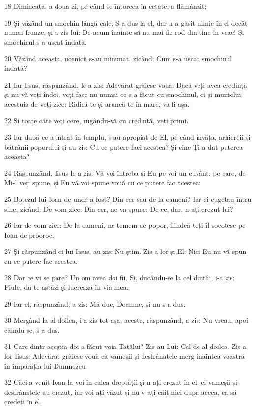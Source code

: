 \par 18 Dimineața, a doua zi, pe când se întorcea în cetate, a flămânzit;
\par 19 Și văzând un smochin lângă cale, S-a dus la el, dar n-a găsit nimic în el decât numai frunze, și a zis lui: De acum înainte să nu mai fie rod din tine în veac! Și smochinul s-a uscat îndată.
\par 20 Văzând aceasta, ucenicii s-au minunat, zicând: Cum s-a uscat smochinul îndată?
\par 21 Iar Iisus, răspunzând, le-a zis: Adevărat grăiesc vouă: Dacă veți avea credință și nu vă veți îndoi, veți face nu numai ce s-a făcut cu smochinul, ci și muntelui acestuia de veți zice: Ridică-te și aruncă-te în mare, va fi așa.
\par 22 Și toate câte veți cere, rugându-vă cu credință, veți primi.
\par 23 Iar după ce a intrat în templu, s-au apropiat de El, pe când învăța, arhiereii și bătrânii poporului și au zis: Cu ce putere faci acestea? Și cine Ți-a dat puterea aceasta?
\par 24 Răspunzând, Iisus le-a zis: Vă voi întreba și Eu pe voi un cuvânt, pe care, de Mi-l veți spune, și Eu vă voi spune vouă cu ce putere fac acestea:
\par 25 Botezul lui Ioan de unde a fost? Din cer sau de la oameni? Iar ei cugetau întru sine, zicând: De vom zice: Din cer, ne va spune: De ce, dar, n-ați crezut lui?
\par 26 Iar de vom zice: De la oameni, ne temem de popor, fiindcă toți îl socotesc pe Ioan de prooroc.
\par 27 Și răspunzând ei lui Iisus, au zis: Nu știm. Zis-a lor și El: Nici Eu nu vă spun cu ce putere fac acestea.
\par 28 Dar ce vi se pare? Un om avea doi fii. Și, ducându-se la cel dintâi, i-a zis: Fiule, du-te astăzi și lucrează în via mea.
\par 29 Iar el, răspunzând, a zis: Mă duc, Doamne, și nu s-a dus.
\par 30 Mergând la al doilea, i-a zis tot așa; acesta, răspunzând, a zis: Nu vreau, apoi căindu-se, s-a dus.
\par 31 Care dintr-aceștia doi a făcut voia Tatălui? Zis-au Lui: Cel de-al doilea. Zis-a lor Iisus: Adevărat grăiesc vouă că vameșii și desfrânatele merg înaintea voastră în împărăția lui Dumnezeu.
\par 32 Căci a venit Ioan la voi în calea dreptății și n-ați crezut în el, ci vameșii și desfrânatele au crezut, iar voi ați văzut și nu v-ați căit nici după aceea, ca să credeți în el.
